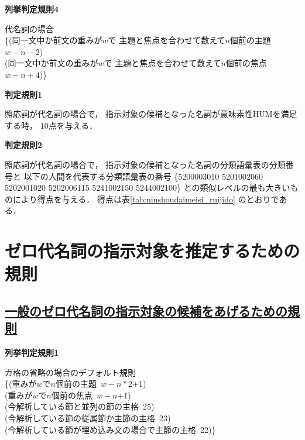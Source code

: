 \vspace{0.5cm}
\noindent
{\bf 列挙判定規則4}
\begin{indention}{0.8cm}\noindent
  代名詞の場合\\
  \{(同一文中か前文の重みが$w$で
  主題と焦点を合わせて数えて$n$個前の主題 \,$w-n-2$)\\
  (同一文中か前文の重みが$w$で
  主題と焦点を合わせて数えて$n$個前の焦点 \,$w-n+4$)\}
\end{indention}

\vspace{0.5cm}
\noindent
{\bf 判定規則1}
\begin{indention}{0.8cm}\noindent
  照応詞が代名詞の場合で，
  指示対象の候補となった名詞が意味素性HUMを満足する時，
  $10$点を与える．
\end{indention}

\vspace{0.5cm}
\noindent
{\bf 判定規則2}
\begin{indention}{0.8cm}\noindent
  照応詞が代名詞の場合で，
  指示対象の候補となった名詞の分類語彙表の分類番号と
  以下の人間を代表する分類語彙表の番号
  \{5200003010 5201002060 5202001020 5202006115 5241002150 5244002100\}
  との類似レベルの最も大きいものにより得点を与える．
  得点は{表\ref{tab:ninshoudaimeisi_ruijido}} のとおりである．
\end{indention}

\section{ゼロ代名詞の指示対象を推定するための規則}
\label{sec:zero_ana}

\subsection*{\underline{一般のゼロ代名詞の指示対象の候補をあげるための規則}}


\noindent
{\bf 列挙判定規則1}
\begin{indention}{0.8cm}\noindent
  ガ格の省略の場合のデフォルト規則\\
  \{(重みが$w$で$n$個前の主題 \,$w-n*2$+1)\\
  (重みが$w$で$n$個前の焦点 \,$w-n$+1)\\
  (今解析している節と並列の節の主格 \,25)\\
  (今解析している節の従属節か主節の主格 \,23)\\
  (今解析している節が埋め込み文の場合で主節の主格 \,22)\}
\end{indention}

